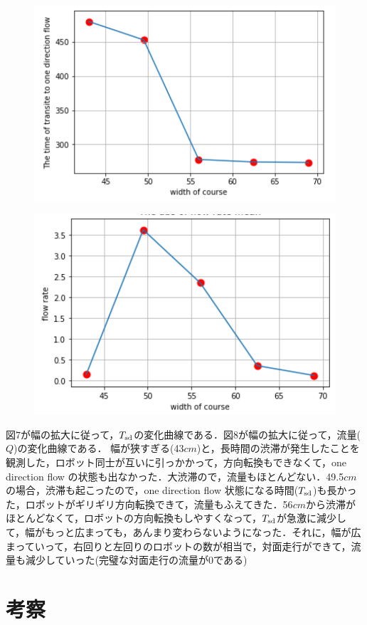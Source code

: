 \documentclass[twocolumn]{jarticle} %
\begin{document}
\begin{figure}[ht]
    \centering
    \includegraphics[width=1.0\linewidth]{diagram1.jpg}
    \caption{}
\end{figure}
\begin{figure}[ht]
    \centering
    \includegraphics[width=1.0\linewidth]{diagram2.jpg}
    \caption{}
\end{figure}

図$7$が幅の拡大に従って，$T_{\rm sd}$の変化曲線である．図$8$が幅の拡大に従って，流量($Q$)の変化曲線である．
幅が狭すぎる(43$cm$)と，長時間の渋滞が発生したことを観測した，ロボット同士が互いに引っかかって，方向転換もできなくて，one direction flow の状態も出なかった．大渋滞ので，流量もほとんどない．49.5$cm$の場合，渋滞も起こったので，one direction flow 状態になる時間($T_{\rm sd}$)も長かった，ロボットがギリギリ方向転換できて，流量もふえてきた．56$cm$から渋滞がほとんどなくて，ロボットの方向転換もしやすくなって，$T_{\rm sd}$が急激に減少して，幅がもっと広まっても，あんまり変わらないようになった．それに，幅が広まっていって，右回りと左回りのロボットの数が相当で，対面走行ができて，流量も減少していった(完璧な対面走行の流量が$0$である)

\section{考察}
\end{document}
